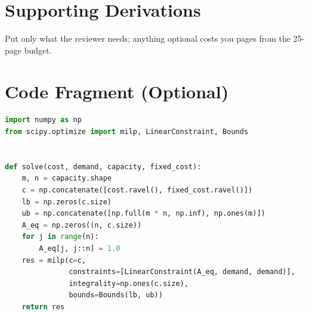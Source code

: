 \documentclass[12pt]{article}
\begin{document}
\newpage
\appendix
\section{Supporting Derivations}
\label{app:derivations}

Put only what the reviewer needs; anything optional costs you pages from the 25-page
budget.

\section{Code Fragment (Optional)}
\label{app:code}

\begin{lstlisting}[language=Python,caption={Core solver loop (abridged)},label={lst:solver}]
import numpy as np
from scipy.optimize import milp, LinearConstraint, Bounds


def solve(cost, demand, capacity, fixed_cost):
    m, n = capacity.shape
    c = np.concatenate([cost.ravel(), fixed_cost.ravel()])
    lb = np.zeros(c.size)
    ub = np.concatenate([np.full(m * n, np.inf), np.ones(m)])
    A_eq = np.zeros((n, c.size))
    for j in range(n):
        A_eq[j, j::n] = 1.0
    res = milp(c=c,
               constraints=[LinearConstraint(A_eq, demand, demand)],
               integrality=np.ones(c.size),
               bounds=Bounds(lb, ub))
    return res
\end{lstlisting}

\newpage
\end{document}
